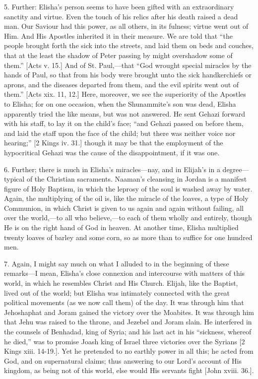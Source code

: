 5. Further: Elisha's person seems to have been gifted with an
extraordinary sanctity and virtue. Even the touch of his relics after
his death raised a dead man. Our Saviour had this power, as all
others, in its fulness; virtue went out of Him. And His Apostles
inherited it in their measure. We are told that ``the people
brought forth the sick into the streets, and laid them on beds and
couches, that at the least the shadow of Peter passing by might
overshadow some of them.'' [Acts v. 15.] And of St. Paul,—that
``God wrought special miracles by the hands of Paul, so that from
his body were brought unto the sick handkerchiefs or aprons, and the
diseases departed from them, and the evil spirits went out of
them.'' [Acts xix. 11, 12.] Here, moreover, we see the superiority
of the Apostles to Elisha; for on one occasion, when the Shunammite's
son was dead, Elisha apparently tried the like means, but was not
answered. He sent Gehazi forward with his staff, to lay it on the
child's face; ``and Gehazi passed on before them, and laid the
staff upon the face of the child; but there was neither voice nor
hearing;'' [2 Kings iv. 31.] though it may be that the employment
of the hypocritical Gehazi was the cause of the disappointment, if it
was one.

6. Further; there is much in Elisha's miracles—nay, and in
Elijah's in a degree—typical of the Christian sacraments. Naaman's
cleansing in Jordan is a manifest figure of Holy Baptism, in which the
leprosy of the soul is washed away by water. Again, the multiplying of
the oil is, like the miracle of the loaves, a type of Holy Communion,
in which Christ is given to us again and again without failing, all
over the world,—to all who believe,—to each of them wholly and
entirely, though He is on the right hand of God in heaven. At another
time, Elisha multiplied twenty loaves of barley and some corn, so as
more than to suffice for one hundred men.

7. Again, I might say much on what I alluded to in the beginning of
these remarks—I mean, Elisha's close connexion and intercourse with
matters of this world, in which he resembles Christ and His Church.
Elijah, like the Baptist, lived out of the world; but Elisha was
intimately connected with the great political movements (as we now
call them) of the day. It was through him that Jehoshaphat and Joram
gained the victory over the Moabites. It was through him that Jehu was
raised to the throne, and Jezebel and Joram slain. He interfered in
the counsels of Benhadad, king of Syria; and his last act in his
``sickness, whereof he died,'' was to promise Joash king of
Israel three victories over the Syrians [2 Kings xiii. 14-19.]. Yet he
pretended to no earthly power in all this; he acted from God, and on
supernatural claims; thus answering to our Lord's account of His
kingdom, as being not of this world, else would His servants fight
[John xviii. 36.].

